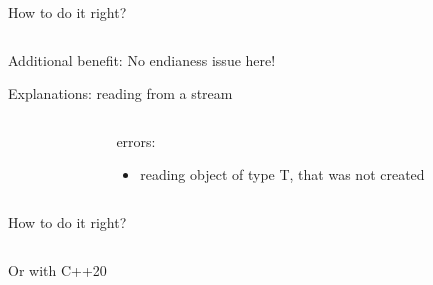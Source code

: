 \documentclass{panicsoftware-presentation}
\makeatletter
\newenvironment{itemizeSeq}{\begin{itemize}[<+-|alert@+>]}{\end{itemize}}
\makeatother
\begin{document}
\begin{frame}{How to do it right?}

\inputminted{\myCpp}{examples/invalid_union_use_right.cpp}

\pause

Additional benefit: \alert{No endianess issue here!}

\end{frame}

\begin{frame}{Explanations: reading from a stream}

\begin{columns}[t]

\begin{column}{0.48\linewidth}
\inputminted{\myCpp}{examples/invalid-reinterpret-cast.cpp}
\end{column}

\begin{column}{0.48\linewidth}
\centerline{\alert{errors:}}

\begin{itemizeSeq}
\item reading object of type T, that was not created
\end{itemizeSeq}
\end{column}

\end{columns}

\end{frame}

\begin{frame}{How to do it right?}

\inputminted{\myCpp}{examples/invalid-reinterpret-cast-right.cpp}

\end{frame}

\begin{frame}{Or with C++20}
\inputminted{\myCpp}{examples/invalid-reinterpret-cast-right-modern.cpp}
\end{frame}
\end{document}

